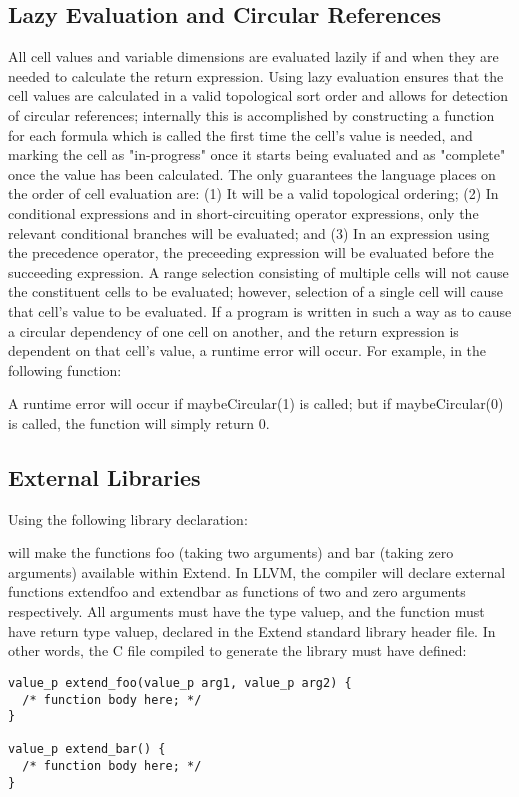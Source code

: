 \subsection{Lazy Evaluation and Circular References}
All cell values and variable dimensions are evaluated lazily if and when they are needed to calculate the return expression. Using lazy evaluation ensures that the cell values are calculated in a valid topological sort order and allows for detection of circular references; internally this is accomplished by constructing a function for each formula which is called the first time the cell's value is needed, and marking the cell as "in-progress" once it starts being evaluated and as "complete" once the value has been calculated. The only guarantees the language places on the order of cell evaluation are: (1) It will be a valid topological ordering; (2) In conditional expressions and in short-circuiting operator expressions, only the relevant conditional branches will be evaluated; and (3) In an expression using the precedence operator, the preceeding expression will be evaluated before the succeeding expression. A range selection consisting of multiple cells will not cause the constituent cells to be evaluated; however, selection of a single cell will cause that cell's value to be evaluated.
If a program is written in such a way as to cause a circular dependency of one cell on another, and the return expression is dependent on that cell's value, a runtime error will occur. For example, in the following function:

A runtime error will occur if maybeCircular(1) is called; but if maybeCircular(0) is called, the function will simply return 0.
\subsection{External Libraries}
\label{sec:ExternFunctionSignatures}
Using the following library declaration:

will make the functions foo (taking two arguments) and bar (taking zero arguments) available within Extend. In LLVM, the compiler will declare external functions extend\textunderscore foo and extend\textunderscore bar as functions of two and zero arguments respectively. All arguments must have the type value\textunderscore p, and the function must have return type value\textunderscore p, declared in the Extend standard library header file. In other words, the C file compiled to generate the library must have defined:
\begin{lstlisting}
value_p extend_foo(value_p arg1, value_p arg2) {
  /* function body here; */
}

value_p extend_bar() {
  /* function body here; */
}
\end{lstlisting}
